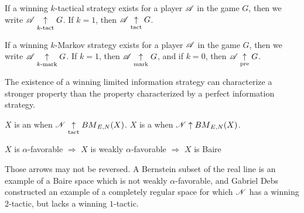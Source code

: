 \begin{defn}
  If a winning $k$-tactical strategy exists for a player $\mathscr{A}$ in the game
  $G$, then we write $\mathscr{A} \underset{k\text{-tact}}{\uparrow} G$. If $k=1$, then $\mathscr{A} \underset{\text{tact}}{\uparrow} G$.

  If a winning $k$-Markov strategy exists for a player $\mathscr{A}$ in the game
  $G$, then we write $\mathscr{A} \underset{k\text{-mark}}{\uparrow} G$. If $k=1$, then $\mathscr{A} \underset{\text{mark}}{\uparrow} G$,
  and if $k=0$, then $\mathscr{A} \underset{\text{pre}}{\uparrow} G$.
\end{defn}

The existence of a winning limited information strategy can characterize a
stronger property than the property characterized by a perfect information
strategy.

\begin{defn}
  $X$ is an 
  when $\mathscr{N} \underset{\text{tact}}{\uparrow} {BM}_{E,N}(X)$.
  $X$ is a 
  when $\mathscr{N} \uparrow {BM}_{E,N}(X)$.
\end{defn}

\begin{prop}
  $X$ is $\alpha$-favorable
    $\Rightarrow$
  $X$ is weakly $\alpha$-favorable
    $\Rightarrow$
  $X$ is Baire
\end{prop}

Those arrows may not be reversed. A Bernstein subset of the real line is an
example of a Baire space which is not weakly $\alpha$-favorable, and Gabriel
Debs constructed an example of a completely regular space for which $\mathscr{N}$
has a winning $2$-tactic, but lacks a winning $1$-tactic. \cite{MR817083}
